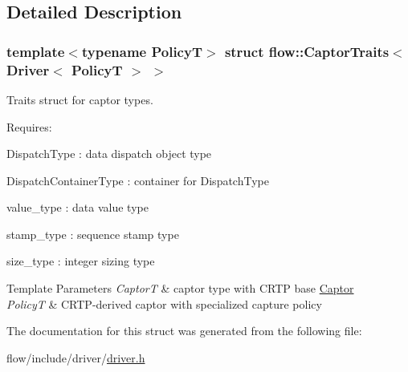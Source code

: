 \subsection{Detailed Description}
\subsubsection*{template$<$typename PolicyT$>$\newline
struct flow\+::\+Captor\+Traits$<$ Driver$<$ Policy\+T $>$ $>$}

Traits struct for captor types. 

Requires\+:
\begin{DoxyItemize}
\item {\ttfamily Dispatch\+Type} \+: data dispatch object type
\item {\ttfamily Dispatch\+Container\+Type} \+: container for {\ttfamily Dispatch\+Type}
\item {\ttfamily value\+\_\+type} \+: data value type
\item {\ttfamily stamp\+\_\+type} \+: sequence stamp type
\item {\ttfamily size\+\_\+type} \+: integer sizing type
\end{DoxyItemize}


\begin{DoxyTemplParams}{Template Parameters}
{\em CaptorT} & captor type with C\+R\+TP base {\ttfamily \hyperlink{classflow_1_1_captor}{Captor}} \\
\hline
{\em PolicyT} & C\+R\+T\+P-\/derived captor with specialized capture policy \\
\hline
\end{DoxyTemplParams}


The documentation for this struct was generated from the following file\+:\begin{DoxyCompactItemize}
\item 
flow/include/driver/\hyperlink{driver_8h}{driver.\+h}\end{DoxyCompactItemize}

